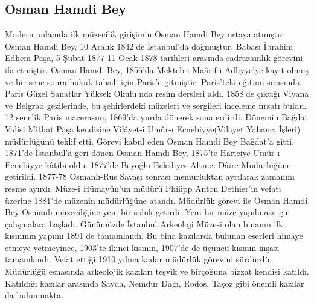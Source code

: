 \subsection{Osman Hamdi Bey}
\indent\indent Modern anlamda ilk müzecilik girişimin Osman Hamdi Bey ortaya atmıştır. Osman Hamdi Bey, 10 Aralık 1842'de İstanbul'da doğmuştur. Babası İbrahim Edhem Paşa, 5 Şubat 1877-11 Ocak 1878 tarihleri arasında sadrazamlık görevini ifa etmiştir. Osman Hamdi Bey, 1856'da Mekteb-i Ma\^{a}rif-i Adliyye'ye kayıt olmuş ve bir sene sonra hukuk tahsili için Paris'e gitmiştir. Paris'teki eğitimi sırasında, Paris Güzel Sanatlar Yüksek Okulu'nda resim dersleri aldı. 1858'de çıktığı Viyana ve Belgrad gezilerinde, bu şehirlerdeki müzeleri ve sergileri inceleme fırsatı buldu. 12 senelik Paris macerasını, 1869'da yurda dönerek sona erdirdi. Dönemin Bağdat Valisi Mithat Paşa kendisine Vil\^{a}yet-i Um\^{u}r-ı Ecnebiyye(Vilayet Yabancı İşleri) müdürlüğünü teklif etti. Görevi kabul eden Osman Hamdi Bey Bağdat'a gitti. 1871'de İstanbul'a geri dönen Osman Hamdi Bey, 1875'te Hariciye Um\^{u}r-ı Ecnebiyye k\^{a}tibi oldu. 1877'de Beyoğlu Belediyes Altıncı D\^{a}ire Müdürlüğüne getirildi. 1877-78 Osmanlı-Rus Savaşı sonrası memurluktan ayrılarak zamanını resme ayırdı. Müze-i Hümay\^{u}n'un müdürü Philipp Anton Dethier'in vefatı üzerine 1881'de müzenin müdürlüğüne atandı.\newline
\indent Müdürlük görevi ile Osman Hamdi Bey Osmanlı müzeciliğine yeni bir soluk getirdi. Yeni bir müze yapılması için çalışmalara başladı. Günümüzde İstanbul Arkeoloji Müzesi olan binanın ilk kısmının yapımı 1891'de tamamlandı. Bu bina kazılarda bulunan eserleri himaye etmeye yetmeyince, 1903'te ikinci kısmın, 1907'de de üçüncü kısmın inşası tamamlandı. Vefat ettiği 1910 yılına kadar müdürlük görevini sürdürdü. Müdürlüğü esnasında arkeolojik kazıları teşvik ve birçoğuna bizzat kendisi katıldı. Katıldığı kazılar arasında Sayda, Nemdur Dağı, Rodos, Taşoz gibi önemli kazılar da bulunmakta.\cite{dia}